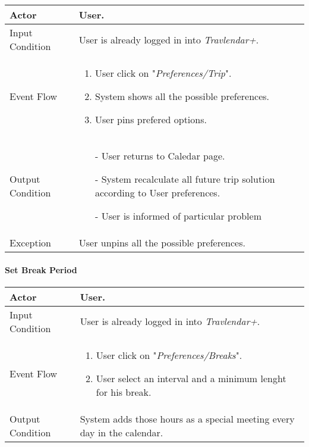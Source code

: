 		\begin{tabular}{| l | p{} | }
			\hline
			\hline
			Actor	&		User. \\
			\hline
			Input Condition		&		User is already logged in into \textit{Travlendar+}. \\
			\hline
			Event Flow		&		\begin{enumerate}
												\item User click on "\textit{Preferences/Trip}".
												\item System shows all the possible preferences.
												\item User pins prefered options.
											\end{enumerate} \\
			\hline
			Output Condition		&		\begin{itemize}
													\item[-] User returns to Caledar page.
													\item[-] System recalculate all future trip solution according to User preferences.
													\item[-] User is informed of particular problem
												\end{itemize} \\
			\hline
			Exception		&		User unpins all the possible preferences. \\
			
			\hline
			\hline
		\end{tabular}
		
		

	\paragraph{Set Break Period}
	
		\begin{tabular}{| l | p{} | }
			\hline
			\hline
			Actor	&		User. \\
			\hline
			Input Condition		&		User is already logged in into \textit{Travlendar+}. \\
			\hline
			Event Flow		&		\begin{enumerate}
												\item User click on "\textit{Preferences/Breaks}".
												\item User select an interval and a minimum lenght for his break.
											\end{enumerate} \\
			\hline
			Output Condition		&		System adds those hours as a special meeting every day in the calendar. \\
			\hline
			\hline
		\end{tabular}

